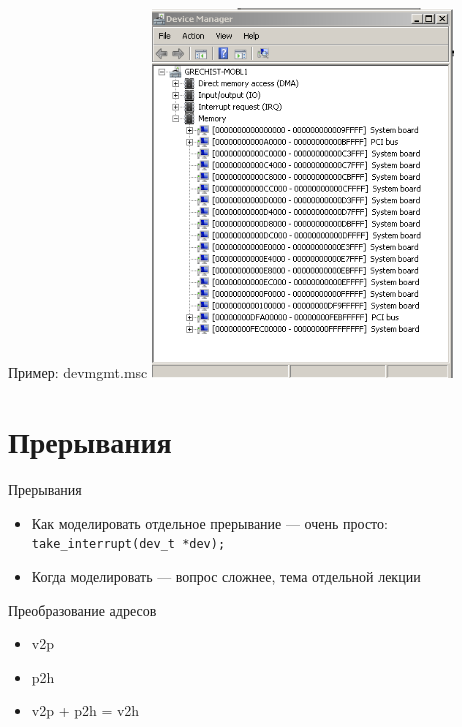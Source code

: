 \documentclass{beamer}
\begin{document}
\begin{frame}{Пример: devmgmt.msc}
\centering
\includegraphics[width=0.6\textwidth]{devicemanager}
\end{frame}

\section{Прерывания}

\begin{frame}{Прерывания}
\begin{centering}

\end{centering}

\begin{itemize}
\item Как моделировать отдельное прерывание — очень просто:\\
\texttt{take_interrupt(dev_t *dev);}
\item Когда моделировать — вопрос сложнее, тема отдельной лекции
\end{itemize}

\end{frame}

\begin{frame}{Преобразование адресов}
\begin{itemize}
\item v2p
\item p2h
\item v2p + p2h =  v2h
\end{itemize}
\end{frame}
\end{document}
